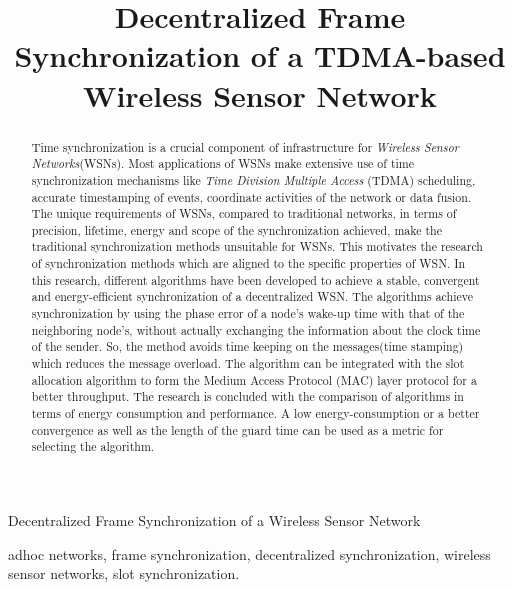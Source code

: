 \documentclass[journal]{IEEEtran}
\begin{document}
%
\title{Decentralized Frame Synchronization of a TDMA-based Wireless Sensor Network}

\author{\IEEEauthorblockN{}
}

{Decentralized Frame Synchronization of a Wireless Sensor Network}

\maketitle

\begin{abstract}
Time synchronization is a crucial component of infrastructure for \textit{Wireless Sensor Networks}(WSNs). Most applications of WSNs
make extensive use of time synchronization mechanisms like  \emph{Time Division Multiple Access} (TDMA) scheduling, accurate
timestamping of events, coordinate activities of the network or data fusion. The unique requirements of WSNs, compared to traditional networks, in terms of precision, lifetime, energy and scope of the synchronization achieved, make the traditional synchronization methods unsuitable for WSNs. This motivates the research of synchronization methods which are
aligned to the specific properties of WSN. In this research, different algorithms have been developed to achieve a stable,
convergent and energy-efficient synchronization of a decentralized WSN. The algorithms achieve synchronization by using the phase error
of a node's wake-up time with that of the neighboring node's, without actually exchanging the information about the clock time of
the sender. So, the method avoids time keeping on the messages(time stamping) which reduces the message overload. The algorithm can be
integrated with the slot allocation algorithm to form the Medium Access Protocol (MAC) layer protocol for a better
throughput. The research is concluded with the comparison of algorithms in terms of energy consumption and performance. A low
energy-consumption or a better convergence as well as the length of the guard time can be used as a metric for selecting the algorithm.
\end{abstract}
\begin{IEEEkeywords}
adhoc networks, frame synchronization, decentralized synchronization, wireless sensor networks,
slot synchronization.
\end{IEEEkeywords}
\end{document}

